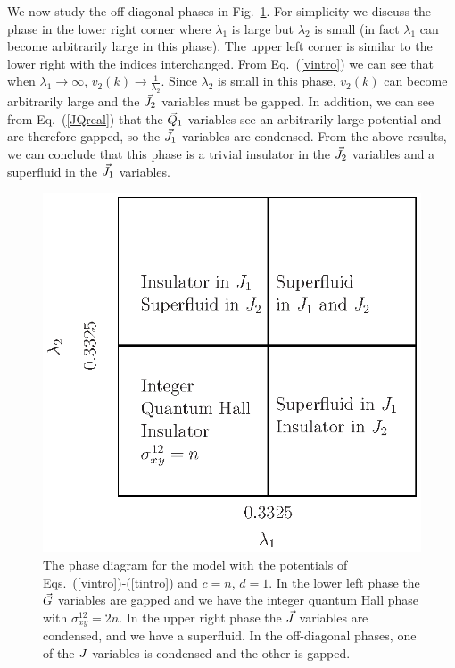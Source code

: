 We now study the off-diagonal phases in Fig.~\ref{intphase}. For simplicity we discuss the phase in the lower right corner where $\lambda_1$ is large but $\lambda_2$ is small (in fact $\lambda_1$ can become arbitrarily large in this phase). The upper left corner is similar to the lower right with the indices interchanged. From Eq.~(\ref{vintro}) we can see that when $\lambda_1\rightarrow\infty$,  $v_2(k)\rightarrow\frac{1}{\lambda_2}$. Since $\lambda_2$ is small in this phase, $v_2(k)$ can become arbitrarily large and the $\vec{J}_2$ variables must be gapped. In addition, we can see from Eq.~(\ref{JQreal}) that the $\vec{Q}_1$ variables see an arbitrarily large potential and are therefore gapped, so the $\vec{J}_1$ variables are condensed. From the above results, we can conclude that this phase is a trivial insulator in the $\vec{J}_2$ variables and a superfluid in the $\vec{J}_1$ variables.

\begin{figure}
\includegraphics[width=\linewidth]{figures/intphase.eps}
\caption{The phase diagram for the model with the potentials of Eqs.~(\ref{vintro})-(\ref{tintro}) and $c=n$, $d=1$. In the lower left phase the $\vec{G}$ variables are gapped and we have the integer quantum Hall phase with $\sigma^{12}_{xy}=2n$. In the upper right phase the $\vec{J}$ variables are condensed, and we have a superfluid.  In the off-diagonal phases, one of the $J$ variables is condensed and the other is gapped.}
\label{intphase}
\end{figure}

